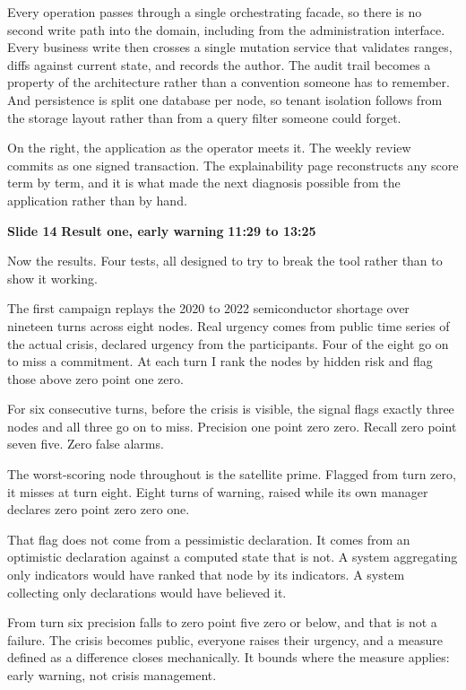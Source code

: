 \documentclass[a4paper,12pt]{article}
\newcommand{\SlideHeading}[3]{%
  \needspace{4\baselineskip}%
  \vspace{10pt}%
  \noindent\colorbox{altenBlueBg}{%
    \parbox{\dimexpr\linewidth-2\fboxsep}{%
      \vspace{3pt}%
      \textbf{\large\color{altenNavy}#1}\quad
      \textbf{\large\color{altenAzureDark}#2}%
      \hfill\textbf{\color{altenAzure}#3}%
      \vspace{3pt}}}%
  \vspace{5pt}\par}
\begin{document}
Every operation passes through a single orchestrating facade, so there is no second write path into the domain, including from the administration interface. Every business write then crosses a single mutation service that validates ranges, diffs against current state, and records the author. The audit trail becomes a property of the architecture rather than a convention someone has to remember. And persistence is split one database per node, so tenant isolation follows from the storage layout rather than from a query filter someone could forget.

On the right, the application as the operator meets it. The weekly review commits as one signed transaction. The explainability page reconstructs any score term by term, and it is what made the next diagnosis possible from the application rather than by hand.

\SlideHeading{Slide 14}{Result one, early warning}{11:29 to 13:25}
Now the results. Four tests, all designed to try to break the tool rather than to show it working.

The first campaign replays the 2020 to 2022 semiconductor shortage over nineteen turns across eight nodes. Real urgency comes from public time series of the actual crisis, declared urgency from the participants. Four of the eight go on to miss a commitment. At each turn I rank the nodes by hidden risk and flag those above zero point one zero.

For six consecutive turns, before the crisis is visible, the signal flags exactly three nodes and all three go on to miss. Precision one point zero zero. Recall zero point seven five. Zero false alarms.

The worst-scoring node throughout is the satellite prime. Flagged from turn zero, it misses at turn eight. Eight turns of warning, raised while its own manager declares zero point zero zero one.

That flag does not come from a pessimistic declaration. It comes from an optimistic declaration against a computed state that is not. A system aggregating only indicators would have ranked that node by its indicators. A system collecting only declarations would have believed it.

From turn six precision falls to zero point five zero or below, and that is not a failure. The crisis becomes public, everyone raises their urgency, and a measure defined as a difference closes mechanically. It bounds where the measure applies: early warning, not crisis management.
\end{document}
